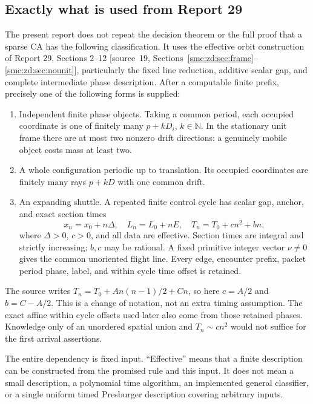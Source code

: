 \documentclass[11pt,letterpaper]{article}
\numberwithin{equation}{section}
\theoremstyle{definition}
\theoremstyle{remark}
\newcommand{\NN}{\mathbb N}
\begin{document}
\subsection{Exactly what is used from Report 29}
The present report does not repeat the decision theorem or the full proof that a sparse CA has the following classification. It uses the effective orbit construction of Report 29, Sections 2--12 \textup{[source~19, Sections~\ref{smc:zd:sec:frame}--\ref{smc:zd:sec:nounit}]}, particularly the fixed line reduction, additive scalar gap, and complete intermediate phase description. After a computable finite prefix, precisely one of the following forms is supplied:
\begin{enumerate}[label=\Alph*.]
\item Independent finite phase objects. Taking a common period, each occupied coordinate is one of finitely many $p+kD_i$, $k\in\NN$. In the stationary unit frame there are at most two nonzero drift directions: a genuinely mobile object costs mass at least two.
\item A whole configuration periodic up to translation. Its occupied coordinates are finitely many rays $p+kD$ with one common drift.
\item An expanding shuttle. A repeated finite control cycle has scalar gap, anchor, and exact section times
\begin{equation}\label{smc:og:eq:section}
 x_n=x_0+n\Delta,\quad L_n=L_0+nE,\quad
 T_n=T_0+cn^2+bn,
\end{equation}
where $\Delta>0$, $c>0$, and all data are effective. Section times are integral and strictly increasing; $b,c$ may be rational. A fixed primitive integer vector $\nu\ne0$ gives the common unoriented flight line. Every edge, encounter prefix, packet period phase, label, and within cycle time offset is retained.
\end{enumerate}
The source writes $T_n=T_0+A n(n-1)/2+Cn$, so here $c=A/2$ and $b=C-A/2$. This is a change of notation, not an extra timing assumption. The exact affine within cycle offsets used later also come from those retained phases. Knowledge only of an unordered spatial union and $T_n\sim cn^2$ would not suffice for the first arrival assertions.

The entire dependency is fixed input. ``Effective'' means that a finite description can be constructed from the promised rule and this input. It does not mean a small description, a polynomial time algorithm, an implemented general classifier, or a single uniform timed Presburger description covering arbitrary inputs.
\end{document}
